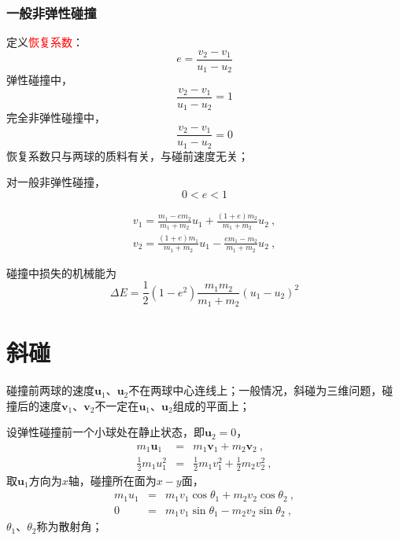 \documentclass[11pt,a4paper]{article}
\renewcommand{\vec}[1]{\boldsymbol{#1}}
\begin{document}
\subsubsection{一般非弹性碰撞}
定义\textcolor{red}{恢复系数}：
\begin{equation}
e = \frac{v_2 -v_1}{u_1 -u_2}
\end{equation}
弹性碰撞中，
\begin{equation}
\frac{v_2 -v_1}{u_1 -u_2} = 1
\end{equation}
完全非弹性碰撞中，
\begin{equation}
\frac{v_2 -v_1}{u_1 -u_2} = 0
\end{equation}
恢复系数只与两球的质料有关，与碰前速度无关；

对一般非弹性碰撞，
\begin{equation}
0 < e < 1
\end{equation}

\begin{eqnarray}
\nonumber v_1 = \frac{m_1 -em_2}{m_1 +m_2}u_1 +\frac{(1+e)m_2}{m_1 +m_2} u_2 ~, \\
v_2 = \frac{(1+e)m_1}{m_1 +m_2} u_1 - \frac{em_1 -m_2}{m_1 +m_2}u_2 ~,
\end{eqnarray}

碰撞中损失的机械能为
\begin{equation}
\Delta E = \frac{1}{2}(1-e^2) \frac{m_1m_2}{m_1+m_2} (u_1 -u_2)^2
\end{equation}


\section{斜碰}
碰撞前两球的速度$\vec{u}_1$、$\vec{u}_2$不在两球中心连线上；一般情况，斜碰为三维问题，碰撞后的速度$\vec{v}_1$、$\vec{v}_2$不一定在$\vec{u}_1$、$\vec{u}_2$组成的平面上；

设弹性碰撞前一个小球处在静止状态，即$\vec{u}_2 = 0$，
\begin{eqnarray}
\nonumber m_1 \vec{u}_1 &=& m_1 \vec{v}_1 +  m_2 \vec{v}_2 ~,\\
\frac{1}{2} m_1 u_1^2 &=& \frac{1}{2} m_1 v_1^2 +\frac{1}{2} m_2 v_2^2 ~,
\end{eqnarray}
取$\vec{u}_1$方向为$x$轴，碰撞所在面为$x-y$面，
\begin{eqnarray}
m_1 u_1 &=& m_1 v_1 \cos \theta_1 +m_2 v_2 \cos \theta_2 ~, \\
0 &=& m_1 v_1 \sin \theta_1 -m_2 v_2 \sin \theta_2 ~, 
\end{eqnarray}
$\theta_1$、$\theta_2$称为散射角；
\end{document}
